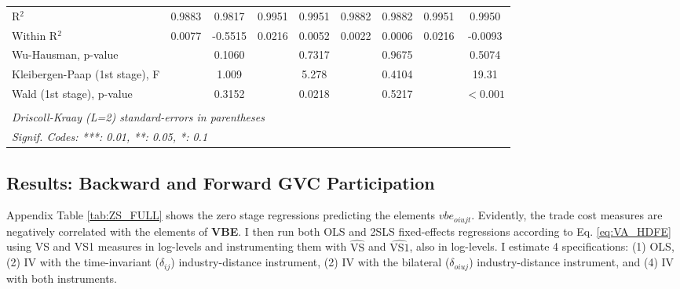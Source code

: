 \documentclass[a4paper]{article}
\begin{document}
\begin{table}[h!]
{\begin{tabular}{lcccccccc}
      R$^2$                               & 0.9883         & 0.9817      & 0.9951         & 0.9951      & 0.9882       & 0.9882      & 0.9951         & 0.9950\\  
      Within R$^2$                        & 0.0077         & -0.5515     & 0.0216         & 0.0052      & 0.0022       & 0.0006      & 0.0216         & -0.0093\\  
      Wu-Hausman, p-value                 &                & 0.1060      &                & 0.7317      &              & 0.9675      &                & 0.5074\\  
      Kleibergen-Paap (1st stage), F &           & 1.009       &                & 5.278       &              & 0.4104      &                & 19.31\\ 
      Wald (1st stage), p-value   &                & 0.3152      &                & 0.0218             &                & 0.5217      &                & $<0.001$ \\  
      \bottomrule \\ [-0.9em]
      \multicolumn{9}{l}{\emph{Driscoll-Kraay (L=2) standard-errors in parentheses}}\\
      \multicolumn{9}{l}{\emph{Signif. Codes: ***: 0.01, **: 0.05, *: 0.1}}\\
   \end{tabular}
   }
\end{table}



\subsection{Results: Backward and Forward GVC Participation}

Appendix Table \ref{tab:ZS_FULL} shows the zero stage regressions predicting the elements $vbe_{oiujt}$. Evidently, the trade cost measures are negatively correlated with the elements of \textbf{VBE}. %
I then run both OLS and 2SLS fixed-effects regressions according to Eq. \ref{eq:VA_HDFE} using VS and VS1 measures in log-levels and instrumenting them with $\hat{\text{VS}}$ and $\hat{\text{VS1}}$, also in log-levels. %
I estimate 4 specifications: (1) OLS, (2) IV with the time-invariant ($\delta_{ij}$) industry-distance instrument,  (2) IV with the bilateral ($\delta_{oiuj}$) industry-distance instrument, and (4) IV with both instruments. \newline
\end{document}
